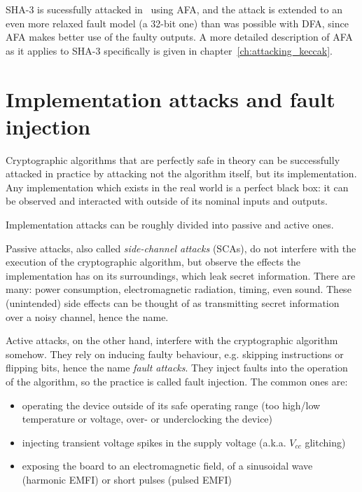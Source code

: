 \documentclass[times, utf8, diplomski]{fer}
\begin{document}
SHA-3 is sucessfully attacked in~\cite{luo2018algebraic} using AFA, and the
attack is extended to an even more relaxed fault model (a 32-bit one) than
was possible with DFA, since AFA makes better use of the faulty outputs.
A more detailed description of AFA as it applies to SHA-3 specifically is
given in chapter~\ref{ch:attacking_keccak}.


\section{Implementation attacks and fault injection}
Cryptographic algorithms that are perfectly safe in theory can be successfully
attacked in practice by attacking not the algorithm itself, but its implementation.
Any implementation which exists in the real world is a perfect black box: it can
be observed and interacted with outside of its nominal inputs and outputs.

Implementation attacks can be roughly divided into passive and active ones.

Passive attacks, also called \emph{side-channel attacks} (SCAs), do not interfere
with the execution of the cryptographic algorithm, but observe the effects the
implementation has on its surroundings, which leak secret information.
There are many: power consumption, electromagnetic radiation, timing, even sound. %
These (unintended) side effects can be thought of as transmitting secret
information over a noisy channel, hence the name.

Active attacks, on the other hand, interfere with the cryptographic algorithm
somehow. They rely on inducing faulty behaviour, e.g. skipping instructions or
flipping bits, hence the name \emph{fault attacks}. They inject faults into the
operation of the algorithm, so the practice is called fault injection.
The common ones are:
\begin{itemize}
  \item operating the device outside of its safe operating range
        (too high/low temperature or voltage, over- or underclocking the device)
  \item injecting transient voltage spikes in the supply voltage (a.k.a. $V_{cc}$ glitching)
  \item exposing the board to an electromagnetic field, of a sinusoidal wave (harmonic EMFI)
        or short pulses (pulsed EMFI)
\end{itemize}

\end{document}
